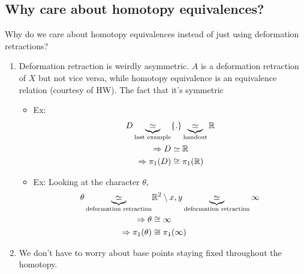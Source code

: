     \subsection{Why care about homotopy equivalences?}
    Why do we care about homotopy equivalences instead of just using deformation retractions?
        \begin{enumerate}
            \item Deformation retraction is weirdly asymmetric. $A$ is a deformation
                retraction of $X$ but not vice versa, while homotopy equivalence is
                an equivalence relation (courtesy of HW). The fact that it's symmetric
                \begin{itemize}
                    \item {Ex:}
                        \begin{align*}
                            D\underbrace{\simeq}_{\text{last example}}& \{.\}
                            \underbrace{\simeq}_{\text{handout}} \mathbb{R}\\
                            \Rightarrow D&\simeq \mathbb{R}\\
                            \Rightarrow \pi_1(D)&\cong \pi_1(\mathbb{R})\\
                        \end{align*}
                    \item {Ex:}
                        Looking at the character $\theta$,
                        \begin{align*}
                            \theta
                            \underbrace{\simeq}_{\text{deformation retraction}}
                            &\mathbb{R}^2\setminus{x,y}
                            \underbrace{\simeq}_{\text{deformation retraction}}
                            \infty\\
                            \Rightarrow \theta &\cong \infty\\
                            \Rightarrow \pi_1(\theta)&\cong \pi_1(\infty)\\
                        \end{align*}
                \end{itemize}
            \item We don't have to worry about base points staying fixed throughout the
                homotopy.
        \end{enumerate}
        

